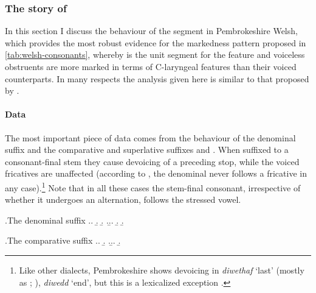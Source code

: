 \subsubsection{The story of \ipa{[h]}}
\label{sec:story-ipah}

In this section I discuss the behaviour of the segment \ipa{[h]} in Pembrokeshire Welsh, which provides the most robust evidence for the markedness pattern proposed in \cref{tab:welsh-consonants}, whereby \ipa{[h]} is the unit segment for the feature  and voiceless obstruents are more marked in terms of C-laryngeal features than their voiced counterparts. In many respects the analysis given here is similar to that proposed by \citet{hannahs11:_welsh}.

\paragraph{Data}
\label{sec:data-6}

The most important piece of data comes from the behaviour of the denominal suffix  and the comparative and superlative suffixes  and . When suffixed to a consonant\hyp final stem they cause devoicing of a preceding stop, while the voiced fricatives \ipa{[v~ð]} are unaffected (according to \cite[§II.38]{gyg}, the denominal  never follows a fricative in any case).\footnote{Like other dialects, Pembrokeshire shows devoicing in \emph{diwethaf} `last' (mostly as \ipa{[dweθa]}; \citealt[\emph{sub voce}]{thomas00:_welsh}), \cf \emph{diwedd} `end', but this is a lexicalized exception \citep[§149.1.i]{wg-mj}.} Note that in all these cases the stem\hyp final consonant, irrespective of whether it undergoes an alternation, follows the stressed vowel.

\ex.\label{ex:pw-pysgota}The denominal suffix 
\a.\a.
\b.
\b.
\z.\b.\a.
\b.
\b.

\ex.\label{ex:pw-comparatives}The comparative suffix 
\a.\a.
\b.
\z.\b.\a.\label{ex:pw-pwysig}
\b.

